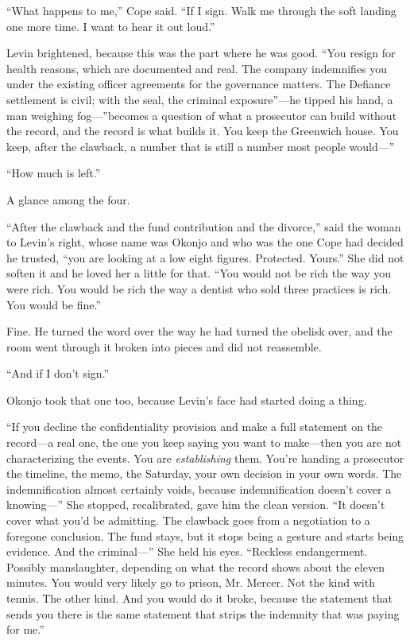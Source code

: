 \documentclass[11pt,openany]{book}
\newcommand{\scenebreak}{\par\vspace{0.5\baselineskip}\begin{center}\textasteriskcentered\quad\textasteriskcentered\quad\textasteriskcentered\end{center}\vspace{0.5\baselineskip}\par}
\begin{document}
``What happens to me,'' Cope said. ``If I sign. Walk me through the soft landing one more time. I want to hear it out loud.''

Levin brightened, because this was the part where he was good. ``You resign for health reasons, which are documented and real. The company indemnifies you under the existing officer agreements for the governance matters. The Defiance settlement is civil; with the seal, the criminal exposure''---he tipped his hand, a man weighing fog---''becomes a question of what a prosecutor can build without the record, and the record is what builds it. You keep the Greenwich house. You keep, after the clawback, a number that is still a number most people would---''

``How much is left.''

A glance among the four.

``After the clawback and the fund contribution and the divorce,'' said the woman to Levin's right, whose name was Okonjo and who was the one Cope had decided he trusted, ``you are looking at a low eight figures. Protected. Yours.'' She did not soften it and he loved her a little for that. ``You would not be rich the way you were rich. You would be rich the way a dentist who sold three practices is rich. You would be fine.''

Fine. He turned the word over the way he had turned the obelisk over, and the room went through it broken into pieces and did not reassemble.

``And if I don't sign.''


\scenebreak


Okonjo took that one too, because Levin's face had started doing a thing.

``If you decline the confidentiality provision and make a full statement on the record---a real one, the one you keep saying you want to make---then you are not characterizing the events. You are \textit{establishing} them. You're handing a prosecutor the timeline, the memo, the Saturday, your own decision in your own words. The indemnification almost certainly voids, because indemnification doesn't cover a knowing---'' She stopped, recalibrated, gave him the clean version. ``It doesn't cover what you'd be admitting. The clawback goes from a negotiation to a foregone conclusion. The fund stays, but it stops being a gesture and starts being evidence. And the criminal---'' She held his eyes. ``Reckless endangerment. Possibly manslaughter, depending on what the record shows about the eleven minutes. You would very likely go to prison, Mr. Mercer. Not the kind with tennis. The other kind. And you would do it broke, because the statement that sends you there is the same statement that strips the indemnity that was paying for me.''
\end{document}
